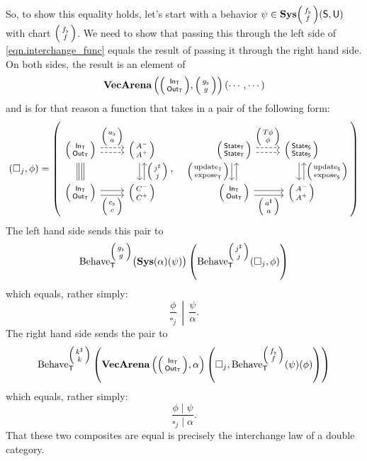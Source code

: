 \documentclass[DynamicalBook]{subfiles}
\begin{document}
\begin{itemize}
So, to show this equality holds, let's start with a behavior $\psi \in \Cat{Sys}\littlelens{f_{\flat}}{f}(\Sys{S}, \Sys{U})$ with chart $\littlelens{f_{\flat}}{f}$. We need to show that
passing this through the left side of \cref{eqn.interchange_func} equals the
result of passing it through the right hand side. On both sides, the result is an element of
\[
\Cat{Vec}\Cat{Arena}\left( \littlelens{\In{T}}{\Out{T}},
      \littlelens{g_{\flat}}{g} \right)\left(\cdots, \cdots  \right)
\]
and is for that reason a function that takes in a pair of the following form:
\[
  (\square_j, \phi) = \left(  
    \begin{tikzcd}[ampersand replacement = \&]
      \lens{\In{T}}{\Out{T}} \ar[r, shift left, dashed, "\lens{a_{\flat}}{a}"] \ar[r, dashed, shift right] \ar[d, shift right,
      equals] \ar[d, shift left, equals] \&
      \lens{A^-}{A^+} \ar[d, shift left, leftarrow,
      "\lens{j^{\sharp}}{j}"] \ar[d, shift right]\\
      \lens{\In{T}}{\Out{T}} \ar[r, shift right, "\lens{c_{\flat}}{c}"'] \ar[r,
      shift left] \& \lens{C^-}{C^+}
    \end{tikzcd}, \quad
    \begin{tikzcd}[ampersand replacement = \&]
      \lens{\State{T}}{\State{T}} \ar[r, shift left, dashed, "\lens{T\phi}{\phi}"] \ar[r, dashed, shift right] \ar[d, shift right,
      "\lens{\update{T}}{\expose{T}}"'] \ar[d, shift left, leftarrow] \&
      \lens{\State{S}}{\State{S}} \ar[d, shift left, leftarrow,
      "\lens{\update{S}}{\expose{S}}"] \ar[d, shift right]\\
      \lens{\In{T}}{\Out{T}} \ar[r, shift right, "\lens{a^{\sharp}}{a}"'] \ar[r,
      shift left] \& \lens{A^-}{A^+}
    \end{tikzcd}
\right)
\]
The left hand side sends this pair to 
\[
\Fun{Behave}_{\Sys{T}}^{\littlelens{g_{\flat}}{g}}
  \big( \Cat{Sys}(\alpha)(\psi) \big)\left(
    \Fun{Behave}_{\Sys{T}}^{\littlelens{j^{\sharp}}{j}}(\square_j, \phi) \right) 
\]
which equals, rather simply:
\[
\left. \frac{\phi}{\square_j} \,\middle|\, \frac{\psi}{\alpha} \right. .
\]
The right hand side sends the pair to
\[
\Fun{Behave}_{\Sys{T}}^{\littlelens{k^{\sharp}}{k}}\left(
  \Cat{Vec}\Cat{Arena}\left( \littlelens{\In{T}}{\Out{T}}, \alpha \right)\left(
    \square_j, \Fun{Behave}_{\Sys{T}}^{\littlelens{f_{\flat}}{f}}(\psi)(\phi) \right) \right)
\]
which equals, rather simply:
\[
\frac{\phi \mid \psi}{\square_j \mid \alpha}.
\]
That these two composites are equal is precisely the interchange law of a double category.


\end{itemize}
\end{document}
